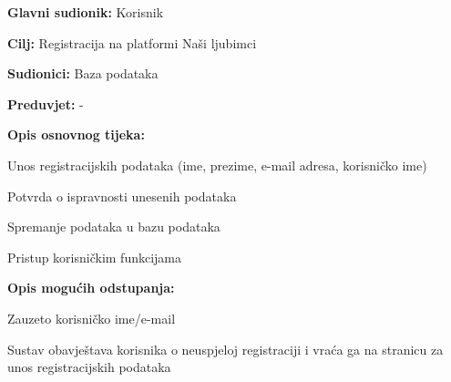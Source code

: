 				\noindent {}
				\begin{packed_item}
					
					\item \textbf{Glavni sudionik: } Korisnik
					\item  \textbf{Cilj:} Registracija na platformi Naši ljubimci
					\item  \textbf{Sudionici:} Baza podataka
					\item  \textbf{Preduvjet:} -
					\item  \textbf{Opis osnovnog tijeka:}
					
					\item[] \begin{packed_enum}
						
						\item Unos registracijskih podataka (ime, prezime, e-mail adresa, korisničko ime)
						\item Potvrda o ispravnosti unesenih podataka
						\item Spremanje podataka u bazu podataka
						\item Pristup korisničkim funkcijama
					\end{packed_enum}
					
					\item  \textbf{Opis mogućih odstupanja:}
					
					\item[] \begin{packed_item}
						
						\item[2.a] Zauzeto korisničko ime/e-mail
						\item[] \begin{packed_enum}
							
							\item Sustav obavještava korisnika o neuspjeloj registraciji i vraća  ga na stranicu za unos registracijskih podataka
							
						\end{packed_enum}
						
					\end{packed_item}
				\end{packed_item}
				
